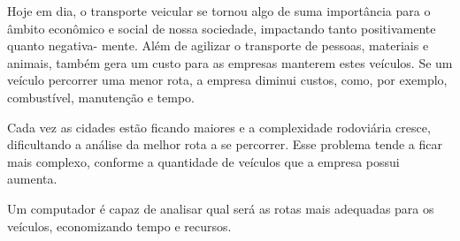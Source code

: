 \documentclass{abnt}
\begin{document}

	
	
	
	


	Hoje em dia, o transporte veicular se tornou algo de suma importância para o âmbito
	econômico e social de nossa sociedade, impactando tanto positivamente quanto negativa-
	mente. 
	Além de agilizar o transporte de pessoas, materiais e animais, também gera um
	custo para as empresas manterem estes veículos. Se um veículo percorrer uma menor rota,
	a empresa diminui custos, como, por exemplo, combustível, manutenção e tempo. 

	Cada vez as cidades estão ficando maiores e a complexidade rodoviária cresce, dificultando a
	análise da melhor rota a se percorrer. Esse problema tende a ficar mais complexo, conforme a quantidade de
	veículos que a empresa possui aumenta.
	
	Um computador é capaz de analisar qual será as rotas mais adequadas para os veículos,
	economizando tempo e recursos.
\end{document}
